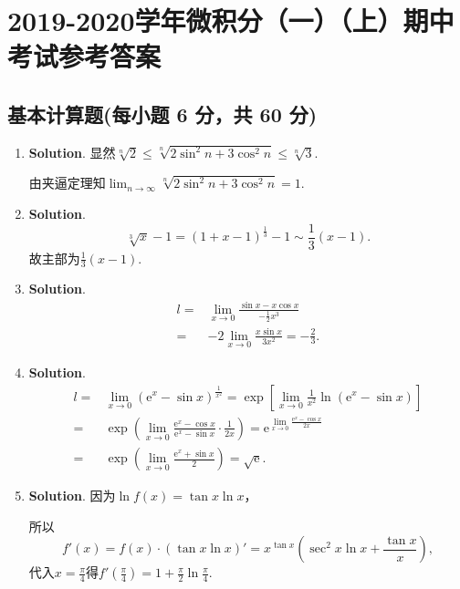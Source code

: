 \documentclass[../main.tex]{subfiles}
\begin{document}
\chapter{2019-2020学年微积分（一）（上）期中考试参考答案}
\section{基本计算题(每小题 6 分，共 60 分)}
\begin{enumerate}
    \item \textbf{Solution}. 显然$\sqrt[n]{2}\leq\sqrt[n]{2\sin^{2} n+3\cos^{2}
                  n}\leq\sqrt[n]{3}$.

          由夹逼定理知$\lim_{n\to\infty}\sqrt[n]{2\sin^{2} n+3\cos^{2} n}=1$.

    \item \textbf{Solution}.
          \[
              \sqrt[3]{x}-1=(1+x-1)^{\frac{1}{3}}-1\sim\frac{1}{3}(x-1).
          \]
          故主部为$\frac{1}{3}(x-1)$.

    \item \textbf{Solution}.
          \[
              \begin{aligned}
                  l= {} & \lim_{x\to0}\frac{\sin x-x\cos x}{-\frac{1}{2}x^3} \\
                  = {}  & -2\lim_{x\to0}\frac{x\sin x}{3x^2}=-\frac{2}{3}.
              \end{aligned}
          \]

    \item \textbf{Solution}.
          \[
              \begin{aligned}
                  l= {} & \lim_{x\to0}\left(\mathrm{e}^{x}-\sin x\right)^{\frac{1}{x^2}}=\exp\left[{\lim\limits_{x\to0} \frac{1}{x^2}\ln\left(\mathrm{e}^x-\sin x\right)}\right]                 \\
                  = {}  & \exp\left({\lim\limits_{x\to0}\frac{\mathrm{e}^x-\cos x}{\mathrm{e}^x-\sin x}\cdot\frac{1}{2x}}\right)= \mathrm{e}^{\lim\limits_{x\to0}\frac{\mathrm{e}^x-\cos x}{2x}} \\
                  = {}  & \exp\left({\lim\limits_{x\to0}\frac{\mathrm{e}^x+\sin x}{2}}\right)=\sqrt{\mathrm{e}}.
              \end{aligned}
          \]

    \item \textbf{Solution}. 因为$\ln f(x)=\tan x\ln x$，

          所以
          \[
              f'(x)=f(x)\cdot\left(\tan x\ln x\right)'=x^{\tan x}\left(\sec^{2} x \ln
              x + \frac{\tan x}{x}\right),
          \]
          代入$x=\frac{\pi}{4}$得$f'\left(\frac{\pi}{4}\right)=1+\frac{\pi}{2}\ln\frac{\pi}{4}$.


\end{enumerate}
\end{document}
